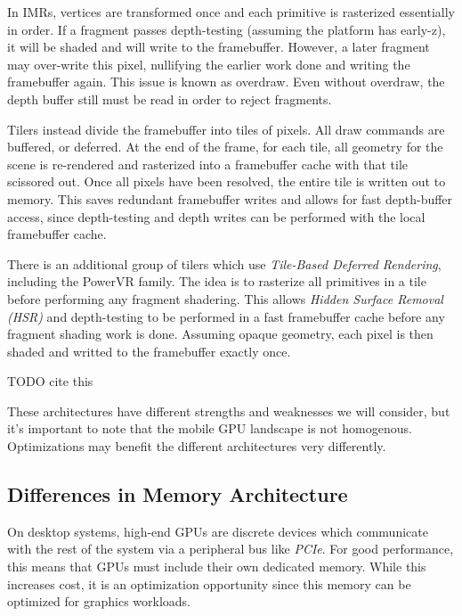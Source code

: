 In IMRs, vertices are transformed once and each primitive is rasterized essentially in order.  If a fragment passes depth-testing (assuming the platform has early-z), it will be shaded and will write to the framebuffer.  However, a later fragment may over-write this pixel, nullifying the earlier work done and writing the framebuffer again.  This issue is known as overdraw.  Even without overdraw, the depth buffer still must be read in order to reject fragments.

Tilers instead divide the framebuffer into tiles of pixels.  All draw commands are buffered, or deferred.  At the end of the frame, for each tile, all geometry for the scene is re-rendered and rasterized into a framebuffer cache with that tile scissored out.  Once all pixels have been resolved, the entire tile is written out to memory.  This saves redundant framebuffer writes and allows for fast depth-buffer access, since depth-testing and depth writes can be performed with the local framebuffer cache.

There is an additional group of tilers which use \textit{Tile-Based Deferred Rendering}, including the PowerVR family.  The idea is to rasterize all primitives in a tile before performing any fragment shadering.  This allows \textit{Hidden Surface Removal (HSR)} and depth-testing to be performed in a fast framebuffer cache before any fragment shading work is done.  Assuming opaque geometry, each pixel is then shaded and writted to the framebuffer exactly once.

TODO cite this

These architectures have different strengths and weaknesses we will consider, but it's important to note that the mobile GPU landscape is not homogenous.  Optimizations may benefit the different architectures very differently.

\subsection{Differences in Memory Architecture}\label{Jon-McCaffrey:differences-in-memory-architecture}

On desktop systems, high-end GPUs are discrete devices which communicate with the rest of the system via a peripheral bus like \textit{PCIe}.  For good performance, this means that GPUs must include their own dedicated memory.  While this increases cost, it is an optimization opportunity since this memory can be optimized for graphics workloads.

